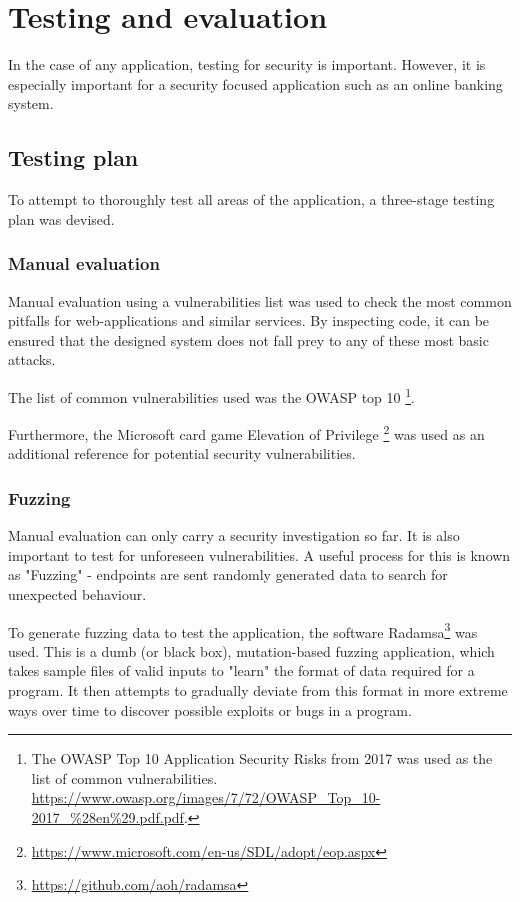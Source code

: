 \section{Testing and evaluation}

In the case of any application, testing for security is important. However, it is especially important for a security focused application such as an online banking system. 

\subsection{Testing plan}

To attempt to thoroughly test all areas of the application, a three-stage testing plan was devised. 

\subsubsection{Manual evaluation}\label{manualEvaluation}

Manual evaluation using a vulnerabilities list was used to check the most common pitfalls for web-applications and similar services. By inspecting code, it can be ensured that the designed system does not fall prey to any of these most basic attacks.

The list of common vulnerabilities used was the OWASP top 10 \footnote{ \nocite{owaspTop10}
    The OWASP Top 10 Application Security Risks from 2017 was used as the list of common vulnerabilities. \url{https://www.owasp.org/images/7/72/OWASP_Top_10-2017_\%28en\%29.pdf.pdf}.
}.

Furthermore, the Microsoft card game Elevation of Privilege \footnote{
    \url{https://www.microsoft.com/en-us/SDL/adopt/eop.aspx} \nocite{microsoftCardGame}
} was used as an additional reference for potential security vulnerabilities.

\subsubsection{Fuzzing}\label{fuzzing}

Manual evaluation can only carry a security investigation so far. It is also important to test for unforeseen vulnerabilities. A useful process for this is known as "Fuzzing" - endpoints are sent randomly generated data to search for unexpected behaviour.

To generate fuzzing data to test the application, the software Radamsa\footnote{
    \url{https://github.com/aoh/radamsa}
} was used. This is a dumb (or black box), mutation-based fuzzing application, which takes sample files of valid inputs to "learn" the format of data required for a program. It then attempts to gradually deviate from this format in more extreme ways over time to discover possible exploits or bugs in a program. \cite{mwrFuzzing}

